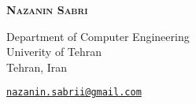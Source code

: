 \documentclass {article}
\newcommand*{\email}[1]{\href{mailto:#1}{\nolinkurl{#1}} }
\begin{document}
	\begin{titlepage} 
		\begin{center}
			\textsc{\bfseries Nazanin Sabri}\\
		\end{center}
		\begin{flushleft}
			Department of Computer Engineering\\
			Univerity of Tehran\\
			Tehran, Iran\\
		\end{flushleft}
		\begin{flushright}
			\email{nazanin.sabrii@gmail.com}
		\end{flushright}
	\end{titlepage}
\end{document}

